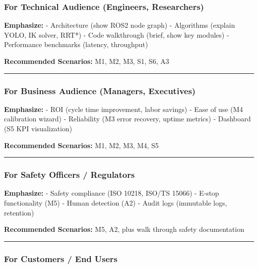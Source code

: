 \documentclass[
]{article}
\begin{document}
\hypertarget{for-technical-audience-engineers-researchers}{%
\subsubsection{For Technical Audience (Engineers,
Researchers)}\label{for-technical-audience-engineers-researchers}}

\textbf{Emphasize:} - Architecture (show ROS2 node graph) - Algorithms
(explain YOLO, IK solver, RRT*) - Code walkthrough (brief, show key
modules) - Performance benchmarks (latency, throughput)

\textbf{Recommended Scenarios:} M1, M2, M3, S1, S6, A3

\begin{center}\rule{0.5\linewidth}{0.5pt}\end{center}

\hypertarget{for-business-audience-managers-executives}{%
\subsubsection{For Business Audience (Managers,
Executives)}\label{for-business-audience-managers-executives}}

\textbf{Emphasize:} - ROI (cycle time improvement, labor savings) - Ease
of use (M4 calibration wizard) - Reliability (M3 error recovery, uptime
metrics) - Dashboard (S5 KPI visualization)

\textbf{Recommended Scenarios:} M1, M2, M3, M4, S5

\begin{center}\rule{0.5\linewidth}{0.5pt}\end{center}

\hypertarget{for-safety-officers-regulators}{%
\subsubsection{For Safety Officers /
Regulators}\label{for-safety-officers-regulators}}

\textbf{Emphasize:} - Safety compliance (ISO 10218, ISO/TS 15066) -
E-stop functionality (M5) - Human detection (A2) - Audit logs (immutable
logs, retention)

\textbf{Recommended Scenarios:} M5, A2, plus walk through safety
documentation

\begin{center}\rule{0.5\linewidth}{0.5pt}\end{center}

\hypertarget{for-customers-end-users}{%
\subsubsection{For Customers / End
Users}\label{for-customers-end-users}}
\end{document}

